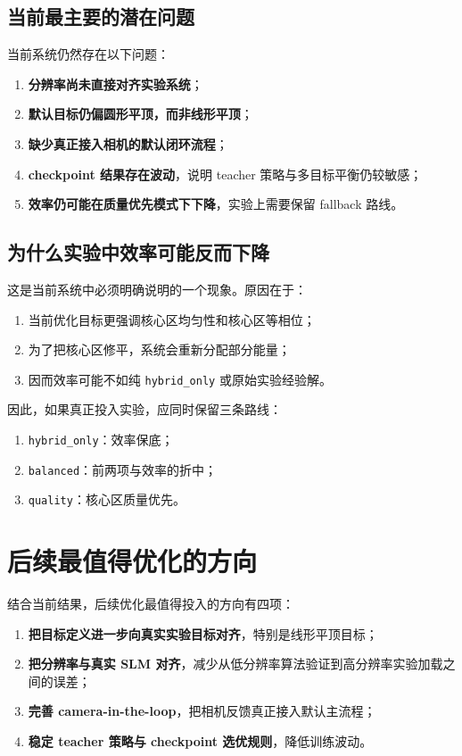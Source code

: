\documentclass[12pt,a4paper]{ctexart}
\begin{document}
\subsection{当前最主要的潜在问题}
当前系统仍然存在以下问题：
\begin{enumerate}[label=\arabic*.]
    \item \textbf{分辨率尚未直接对齐实验系统}；
    \item \textbf{默认目标仍偏圆形平顶，而非线形平顶}；
    \item \textbf{缺少真正接入相机的默认闭环流程}；
    \item \textbf{checkpoint 结果存在波动}，说明 teacher 策略与多目标平衡仍较敏感；
    \item \textbf{效率仍可能在质量优先模式下下降}，实验上需要保留 fallback 路线。
\end{enumerate}

\subsection{为什么实验中效率可能反而下降}
这是当前系统中必须明确说明的一个现象。原因在于：
\begin{enumerate}[label=\arabic*.]
    \item 当前优化目标更强调核心区均匀性和核心区等相位；
    \item 为了把核心区修平，系统会重新分配部分能量；
    \item 因而效率可能不如纯 \texttt{hybrid\_only} 或原始实验经验解。
\end{enumerate}

因此，如果真正投入实验，应同时保留三条路线：
\begin{enumerate}[label=\arabic*.]
    \item \texttt{hybrid\_only}：效率保底；
    \item \texttt{balanced}：前两项与效率的折中；
    \item \texttt{quality}：核心区质量优先。
\end{enumerate}

\section{后续最值得优化的方向}
结合当前结果，后续优化最值得投入的方向有四项：
\begin{enumerate}[label=\arabic*.]
    \item \textbf{把目标定义进一步向真实实验目标对齐}，特别是线形平顶目标；
    \item \textbf{把分辨率与真实 SLM 对齐}，减少从低分辨率算法验证到高分辨率实验加载之间的误差；
    \item \textbf{完善 camera-in-the-loop}，把相机反馈真正接入默认主流程；
    \item \textbf{稳定 teacher 策略与 checkpoint 选优规则}，降低训练波动。
\end{enumerate}
\end{document}
